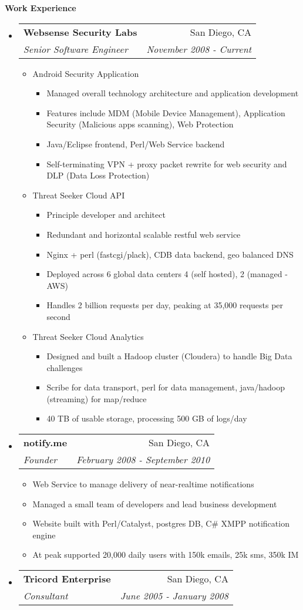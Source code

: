 \documentclass[letterpaper,11pt]{article}
\makeatletter
\newcommand{\resitem}[1]{\item #1 \vspace{-2pt}}
\newcommand{\resheading}[1]{{\large \colorbox{mygrey}{\begin{minipage}{\textwidth}{\textbf{#1 \vphantom{p\^{E}}}}\end{minipage}}}}
\newcommand{\ressubheading}[4]{
  \begin{tabular*}{7.0in}{l@{\extracolsep{\fill}}r}
    \textbf{#1} & #2 \\
    \textit{#3} & \textit{#4} \\
  \end{tabular*}\vspace{-6pt}}
\makeatother
\begin{document}
\resheading{Work Experience}
\begin{itemize}
\item
  \ressubheading{Websense Security Labs}{San Diego, CA}{Senior Software Engineer}{November 2008 - Current}
  \begin{itemize}
    \resitem{Android Security Application}
    \begin{itemize}
      \resitem{Managed overall technology architecture and application development }
      \resitem{Features include MDM (Mobile Device Management), Application Security (Malicious apps scanning), Web Protection  }
      \resitem{Java/Eclipse frontend, Perl/Web Service backend}
      \resitem{Self-terminating VPN + proxy packet rewrite for web security and DLP (Data Loss Protection) }
    \end{itemize}
    \resitem{Threat Seeker Cloud API}
    \begin{itemize}
      \resitem{Principle developer and architect }
      \resitem{Redundant and horizontal scalable restful web service}
      \resitem{Nginx + perl (fastcgi/plack), CDB data backend, geo balanced DNS}
      \resitem{Deployed across 6 global data centers 4 (self hosted), 2 (managed - AWS)}
      \resitem{Handles 2 billion requests per day, peaking at 35,000 requests per second}
    \end{itemize}
    \resitem{Threat Seeker Cloud Analytics}
    \begin{itemize}
      \resitem{Designed and built a Hadoop cluster (Cloudera) to handle Big Data challenges}
      \resitem{Scribe for data transport, perl for data management, java/hadoop (streaming) for map/reduce }
      \resitem{40 TB of usable storage, processing 500 GB of logs/day }
    \end{itemize}
  \end{itemize}
\item
  \ressubheading{notify.me}{San Diego, CA}{Founder}{February 2008 - September 2010}
  \begin{itemize}
    \resitem{Web Service to manage delivery of near-realtime notifications}
    \resitem{Managed a small team of developers and lead business development}
    \resitem{Website built with Perl/Catalyst, postgres DB, C\# XMPP notification engine}        
    \resitem{At peak supported 20,000 daily users with 150k emails, 25k sms, 350k IM} 
  \end{itemize}
\item
  \ressubheading{Tricord Enterprise}{San Diego, CA}{Consultant}{June 2005 - January 2008}
  \begin{itemize}

\end{itemize}
\end{itemize}
\end{document}
